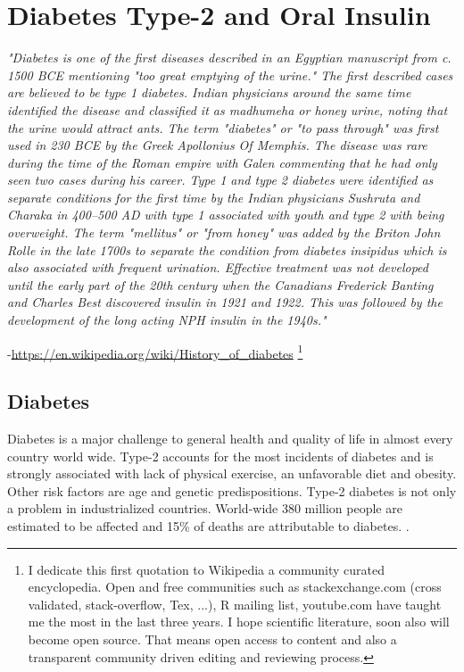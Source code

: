 \chapter{Diabetes Type-2 and Oral Insulin}


\textit{"Diabetes is one of the first diseases described in an Egyptian manuscript from c. 1500 BCE mentioning "too great emptying of the urine." The first described cases are believed to be type 1 diabetes. Indian physicians around the same time identified the disease and classified it as madhumeha or honey urine, noting that the urine would attract ants. The term "diabetes" or "to pass through" was first used in 230 BCE by the Greek Apollonius Of Memphis. The disease was rare during the time of the Roman empire with Galen commenting that he had only seen two cases during his career. Type 1 and type 2 diabetes were identified as separate conditions for the first time by the Indian physicians Sushruta and Charaka in 400–500 AD with type 1 associated with youth and type 2 with being overweight. The term "mellitus" or "from honey" was added by the Briton John Rolle in the late 1700s to separate the condition from diabetes insipidus which is also associated with frequent urination. Effective treatment was not developed until the early part of the 20th century when the Canadians Frederick Banting and Charles Best discovered insulin in 1921 and 1922. This was followed by the development of the long acting NPH insulin in the 1940s."}

-\url{https://en.wikipedia.org/wiki/History_of_diabetes} \footnote{I dedicate this first quotation to Wikipedia a community curated encyclopedia. Open and free communities such as stackexchange.com (cross validated, stack-overflow, Tex, ...), R mailing list, youtube.com have taught me the most in the last three years. I hope scientific literature, soon also will become open source. That means open access to content and also a transparent community driven editing and reviewing process.}
\newpage

\section{Diabetes}
Diabetes is a major challenge to general health and quality of life in almost every country world wide. Type-2 accounts for the most incidents of diabetes and is strongly associated with lack of physical exercise, an unfavorable diet and obesity. Other risk factors are age and genetic predispositions. Type-2 diabetes is not only a problem in industrialized countries.  World-wide 380 million people are estimated to be affected and 15\% of deaths are attributable to diabetes. \cite{aguiree2013idf}.


